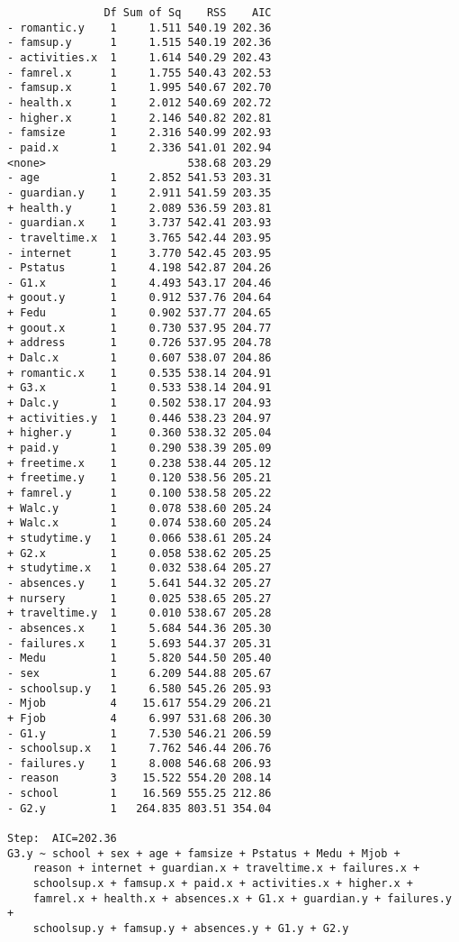 \documentclass[11pt]{article}
\begin{document}
\begin{enumerate}
\begin{verbatim}
               Df Sum of Sq    RSS    AIC
- romantic.y    1     1.511 540.19 202.36
- famsup.y      1     1.515 540.19 202.36
- activities.x  1     1.614 540.29 202.43
- famrel.x      1     1.755 540.43 202.53
- famsup.x      1     1.995 540.67 202.70
- health.x      1     2.012 540.69 202.72
- higher.x      1     2.146 540.82 202.81
- famsize       1     2.316 540.99 202.93
- paid.x        1     2.336 541.01 202.94
<none>                      538.68 203.29
- age           1     2.852 541.53 203.31
- guardian.y    1     2.911 541.59 203.35
+ health.y      1     2.089 536.59 203.81
- guardian.x    1     3.737 542.41 203.93
- traveltime.x  1     3.765 542.44 203.95
- internet      1     3.770 542.45 203.95
- Pstatus       1     4.198 542.87 204.26
- G1.x          1     4.493 543.17 204.46
+ goout.y       1     0.912 537.76 204.64
+ Fedu          1     0.902 537.77 204.65
+ goout.x       1     0.730 537.95 204.77
+ address       1     0.726 537.95 204.78
+ Dalc.x        1     0.607 538.07 204.86
+ romantic.x    1     0.535 538.14 204.91
+ G3.x          1     0.533 538.14 204.91
+ Dalc.y        1     0.502 538.17 204.93
+ activities.y  1     0.446 538.23 204.97
+ higher.y      1     0.360 538.32 205.04
+ paid.y        1     0.290 538.39 205.09
+ freetime.x    1     0.238 538.44 205.12
+ freetime.y    1     0.120 538.56 205.21
+ famrel.y      1     0.100 538.58 205.22
+ Walc.y        1     0.078 538.60 205.24
+ Walc.x        1     0.074 538.60 205.24
+ studytime.y   1     0.066 538.61 205.24
+ G2.x          1     0.058 538.62 205.25
+ studytime.x   1     0.032 538.64 205.27
- absences.y    1     5.641 544.32 205.27
+ nursery       1     0.025 538.65 205.27
+ traveltime.y  1     0.010 538.67 205.28
- absences.x    1     5.684 544.36 205.30
- failures.x    1     5.693 544.37 205.31
- Medu          1     5.820 544.50 205.40
- sex           1     6.209 544.88 205.67
- schoolsup.y   1     6.580 545.26 205.93
- Mjob          4    15.617 554.29 206.21
+ Fjob          4     6.997 531.68 206.30
- G1.y          1     7.530 546.21 206.59
- schoolsup.x   1     7.762 546.44 206.76
- failures.y    1     8.008 546.68 206.93
- reason        3    15.522 554.20 208.14
- school        1    16.569 555.25 212.86
- G2.y          1   264.835 803.51 354.04

Step:  AIC=202.36
G3.y ~ school + sex + age + famsize + Pstatus + Medu + Mjob + 
    reason + internet + guardian.x + traveltime.x + failures.x + 
    schoolsup.x + famsup.x + paid.x + activities.x + higher.x + 
    famrel.x + health.x + absences.x + G1.x + guardian.y + failures.y + 
    schoolsup.y + famsup.y + absences.y + G1.y + G2.y


\end{verbatim}
\end{enumerate}
\end{document}
